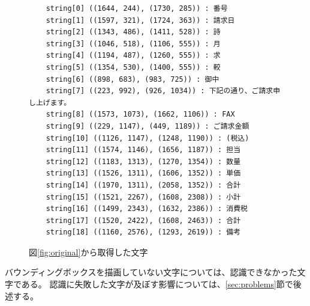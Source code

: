 \lstset{language=}
\begin{figure}[t]
    \begin{lstlisting}
    string[0] ((1644, 244), (1730, 285)) : 番号
    string[1] ((1597, 321), (1724, 363)) : 請求日
    string[2] ((1343, 486), (1411, 528)) : 詩
    string[3] ((1046, 518), (1106, 555)) : 月
    string[4] ((1194, 487), (1260, 555)) : 求
    string[5] ((1354, 530), (1400, 555)) : 較
    string[6] ((898, 683), (983, 725)) : 御中
    string[7] ((223, 992), (926, 1034)) : 下記の通り、ご請求申し上げます。
    string[8] ((1573, 1073), (1662, 1106)) : FAX
    string[9] ((229, 1147), (449, 1189)) : ご請求金額
    string[10] ((1126, 1147), (1248, 1190)) : (税込)
    string[11] ((1574, 1146), (1656, 1187)) : 担当
    string[12] ((1183, 1313), (1270, 1354)) : 数量
    string[13] ((1526, 1311), (1606, 1352)) : 単価
    string[14] ((1970, 1311), (2058, 1352)) : 合計
    string[15] ((1521, 2267), (1608, 2308)) : 小計
    string[16] ((1499, 2343), (1632, 2386)) : 消費税
    string[17] ((1520, 2422), (1608, 2463)) : 合計
    string[18] ((1160, 2576), (1293, 2619)) : 備考
    \end{lstlisting}
    \caption{図\ref{fig:original}から取得した文字}
    \label{fig:char_recognition_for_original}
\end{figure}

バウンディングボックスを描画していない文字については、認識できなかった文字である。
認識に失敗した文字が及ぼす影響については、\ref{sec:problems}節で後述する。

